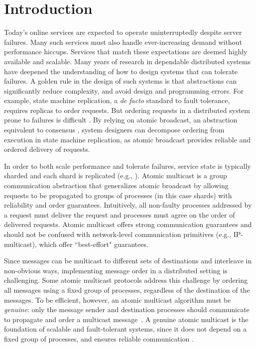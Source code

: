 \section{Introduction}
\label{sec:introduction}

Today's online services are expected to operate uninterruptedly despite server failures.
Many such services must also handle ever-increasing demand without performance hiccups.
Services that match these expectations are deemed highly available and scalable.
Many years of research in dependable distributed systems have deepened the understanding of how to design systems that can tolerate failures.
A golden rule in the design of such systems is that abstractions can significantly reduce complexity, and avoid design and programming errors.
For example, state machine replication, a \emph{de facto} standard to fault tolerance, requires replicas to order requests.
But ordering requests in a distributed system prone to failures is difficult \cite{FLP85}.
By relying on atomic broadcast, an abstraction equivalent to consensus \cite{HT93,CT96}, system designers can decompose ordering from execution in state machine replication, as atomic broadcast provides reliable and ordered delivery of requests.

In order to both scale performance and tolerate failures, service state is typically sharded and each shard is replicated (e.g., \cite{CDE12,Long2019,Aguilera:2007}).
Atomic multicast is a group communication abstraction that generalizes atomic broadcast by allowing requests to be propagated to groups of processes (in this case shards) with reliability and order guarantees.
Intuitively, all non-faulty processes addressed by a request must deliver the request and processes must agree on the order of delivered requests.
Atomic multicast offers strong communication guarantees and should not be confused with network-level communication primitives (e.g., IP-multicast), which offer ``best-effort" guarantees.

Since messages can be multicast to different sets of destinations and interleave in non-obvious ways, implementing message order in a distributed setting is challenging.
Some atomic multicast protocols address this challenge by ordering all messages using a fixed group of processes, regardless of the destination of the messages.
To be efficient, however, an atomic multicast algorithm must be \emph{genuine}: only the message sender and destination processes should communicate to propagate and order a multicast message~\cite{GS01b}.
A genuine atomic multicast is the foundation of scalable and fault-tolerant systems, since it does not depend on a fixed group of processes, and ensures reliable communication \cite{Coelho2017}.

